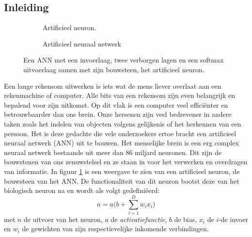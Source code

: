 \subsection{Inleiding}
\begin{figure}
	\centering
	\begin{subfigure}{.5\textwidth}
		\centering
		
		\caption{Artificieel neuron.}
		\label{fig:neuron}
	\end{subfigure}%
	\begin{subfigure}{.5\textwidth}
		\centering
		
		\caption{Artificieel neuraal netwerk}
		\label{fig:ANN}
	\end{subfigure}
	\caption{Een ANN met een invoerlaag, twee verborgen lagen en een softmax uitvoerlaag samen met zijn bouwsteen, het artificieel neuron.}
	\label{fig:test}
\end{figure}
Een lange rekensom uitwerken is iets wat de mens liever overlaat aan een rekenmachine of computer. Alle bits van een rekensom zijn even belangrijk en bepalend voor zijn uitkomst. Op dit vlak is een computer veel effici\"enter en betrouwbaarder dan ons brein. Onze hersenen zijn veel bedrevener in andere taken zoals het indelen van objecten volgens gelijkenis of het herkennen van een persoon.
\npar Het is deze gedachte die vele onderzoekers ertoe bracht een artificieel neuraal netwerk (ANN) uit te bouwen. Het menselijke brein is een erg complex neuraal netwerk bestaande uit meer dan 86 miljard neuronen. Dit zijn de bouwstenen van ons zenuwstelsel en ze staan in voor het verwerken en overdragen van informatie. In figuur \ref{fig:neuron} is een weergave te zien van een artificieel neuron, de bouwsteen van het ANN. De functionaliteit van dit neuron bootst deze van het biologisch neuron na en wordt als volgt gedefini\"eerd:
\begin{equation}\label{eq:neuron}
n = a\bigg(b+\sum_{i=1}^{D}w_ix_i\bigg)
\end{equation}
met $n$ de uitvoer van het neuron, $a$ de \textit{activatiefunctie}, $b$ de bias, $x_i$ de $i$-de invoer en $w_i$ de gewichten van zijn respectievelijke inkomende verbindingen.



